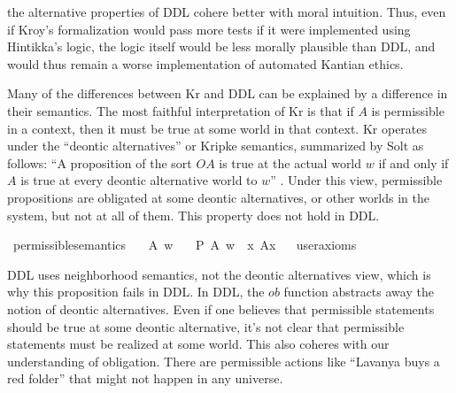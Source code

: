 \begin{isabellebody}
\begin{isamarkuptext}
the alternative properties of DDL cohere better with moral intuition. Thus, even if Kroy's formalization
would pass more tests if it were implemented using Hintikka's logic, the logic itself would be less 
morally plausible than DDL, and would thus remain a worse implementation of automated Kantian ethics.%
\end{isamarkuptext}\isamarkuptrue%
%
\begin{isamarkuptext}%
Many of the differences between Kr and DDL can be explained by a difference in their semantics. The most 
faithful interpretation of Kr is that if $A$ is permissible in a context, then 
it must be true at some world in that context. Kr operates under the ``deontic alternatives'' or Kripke semantics, 
summarized by Solt as follows: ``A proposition of the sort $O A$ is true at the actual world $w$ if and
only if $A$ is true at every deontic alternative world to $w$''  \citep{solt}. Under this view, permissible propositions
are obligated at some deontic alternatives, or other worlds in the system, but not at all of them. This
property does not hold in DDL.%
\end{isamarkuptext}\isamarkuptrue%
\isamarkupfalse%
\ permissible{\isacharunderscore}semantics{\isacharcolon}\isanewline
\ \ \ A\ w\isanewline
\ \ \ {\isachardoublequoteopen}{\isacharparenleft}P\ {\isacharbraceleft}A{\isacharbraceright}{\isacharparenright}\ w\ {\isasymlongrightarrow}\ {\isacharparenleft}{\isasymexists}x{\isachardot}\ A{\isacharparenleft}x{\isacharparenright}{\isacharparenright}{\isachardoublequoteclose}\isanewline
\ \ \isamarkupfalse%
{\isacharbrackleft}user{\isacharunderscore}axioms{\isacharbrackright}%
\isadelimproof
\ %
\endisadelimproof
%
\isatagproof
{}\isamarkupfalse%
\isanewline
%
%
\endisatagproof
{\isafoldproof}%
%
\isadelimproof
%
\endisadelimproof
%
\begin{isamarkuptext}%
DDL uses neighborhood semantics, not the deontic alternatives view, which is why this
 proposition fails in DDL. In DDL, the $ob$ function abstracts away the notion of
 deontic alternatives. Even if one believes that permissible 
statements should be true at some deontic alternative, it's not clear that permissible statements
 must be realized at some world. This also coheres with our understanding of obligation. There 
are permissible actions like ``Lavanya buys a red folder'' that might not happen in any universe.


\end{isamarkuptext}
\end{isabellebody}

